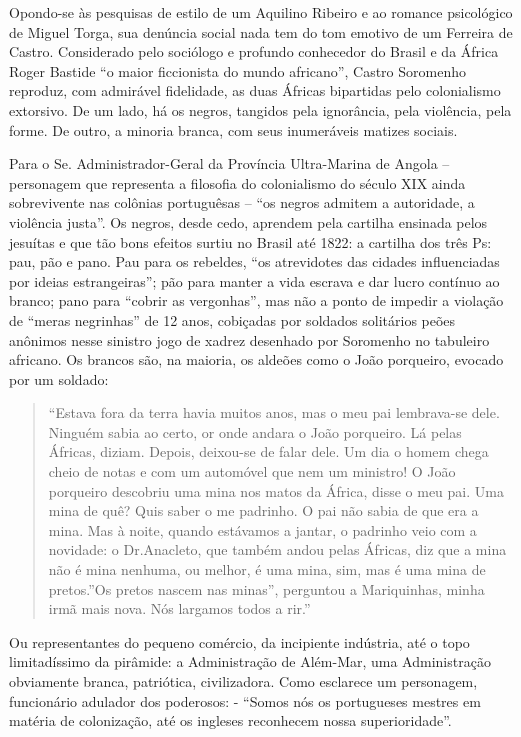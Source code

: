 \documentclass[
  letterpaper,
  DIV=11,
  numbers=noendperiod]{scrreprt}
\begin{document}
Opondo-se às pesquisas de estilo de um Aquilino Ribeiro e ao romance
psicológico de Miguel Torga, sua denúncia social nada tem do tom emotivo
de um Ferreira de Castro. Considerado pelo sociólogo e profundo
conhecedor do Brasil e da África Roger Bastide ``o maior ficcionista do
mundo africano'', Castro Soromenho reproduz, com admirável fidelidade,
as duas Áfricas bipartidas pelo colonialismo extorsivo. De um lado, há
os negros, tangidos pela ignorância, pela violência, pela forme. De
outro, a minoria branca, com seus inumeráveis matizes sociais.

Para o Se. Administrador-Geral da Província Ultra-Marina de Angola --
personagem que representa a filosofia do colonialismo do século XIX
ainda sobrevivente nas colônias portuguêsas -- ``os negros admitem a
autoridade, a violência justa''. Os negros, desde cedo, aprendem pela
cartilha ensinada pelos jesuítas e que tão bons efeitos surtiu no Brasil
até 1822: a cartilha dos três Ps: pau, pão e pano. Pau para os rebeldes,
``os atrevidotes das cidades influenciadas por ideias estrangeiras'';
pão para manter a vida escrava e dar lucro contínuo ao branco; pano para
``cobrir as vergonhas'', mas não a ponto de impedir a violação de
``meras negrinhas'' de 12 anos, cobiçadas por soldados solitários peões
anônimos nesse sinistro jogo de xadrez desenhado por Soromenho no
tabuleiro africano. Os brancos são, na maioria, os aldeões como o João
porqueiro, evocado por um soldado:

\begin{quote}
``Estava fora da terra havia muitos anos, mas o meu pai lembrava-se
dele. Ninguém sabia ao certo, or onde andara o João porqueiro. Lá pelas
Áfricas, diziam. Depois, deixou-se de falar dele. Um dia o homem chega
cheio de notas e com um automóvel que nem um ministro! O João porqueiro
descobriu uma mina nos matos da África, disse o meu pai. Uma mina de
quê? Quis saber o me padrinho. O pai não sabia de que era a mina. Mas à
noite, quando estávamos a jantar, o padrinho veio com a novidade: o
Dr.Anacleto, que também andou pelas Áfricas, diz que a mina não é mina
nenhuma, ou melhor, é uma mina, sim, mas é uma mina de pretos.''Os
pretos nascem nas minas'', perguntou a Mariquinhas, minha irmã mais
nova. Nós largamos todos a rir.''
\end{quote}

Ou representantes do pequeno comércio, da incipiente indústria, até o
topo limitadíssimo da pirâmide: a Administração de Além-Mar, uma
Administração obviamente branca, patriótica, civilizadora. Como
esclarece um personagem, funcionário adulador dos poderosos: - ``Somos
nós os portugueses mestres em matéria de colonização, até os ingleses
reconhecem nossa superioridade''.
\end{document}
